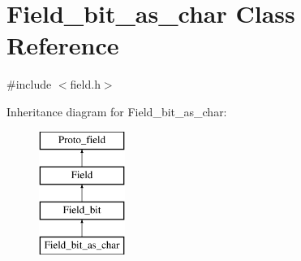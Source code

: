 \hypertarget{classField__bit__as__char}{}\section{Field\+\_\+bit\+\_\+as\+\_\+char Class Reference}
\label{classField__bit__as__char}


{\ttfamily \#include $<$field.\+h$>$}

Inheritance diagram for Field\+\_\+bit\+\_\+as\+\_\+char\+:\begin{figure}[H]
\begin{center}
\leavevmode
\includegraphics[height=4.000000cm]{classField__bit__as__char}
\end{center}
\end{figure}
